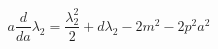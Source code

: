 \begin{equation}
a \frac {d} {da} \lambda_2=\frac {\lambda_2^2} 2 + d \lambda_2-2
m^2- 2 p^2 a^2 \label{flowapp}
\end{equation}

